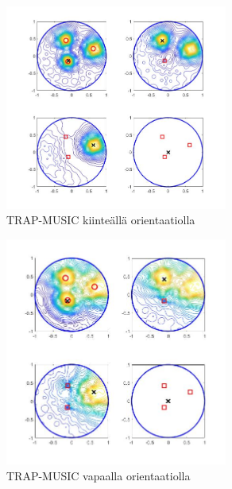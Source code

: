 \clearpage
\begin{figure}[ht]
    \centering
    \includegraphics[width = 0.65\textwidth]{trap.jpg}
    \caption{TRAP-MUSIC kiinteällä orientaatiolla}
    \label{fig:TRAPfix}
\end{figure}

\begin{figure}[h!]
    \centering
    \includegraphics[width = 0.65\textwidth]{trapp.jpg} 
    \caption{TRAP-MUSIC vapaalla orientaatiolla}
    \label{fig:TRAPfree}
\end{figure}

